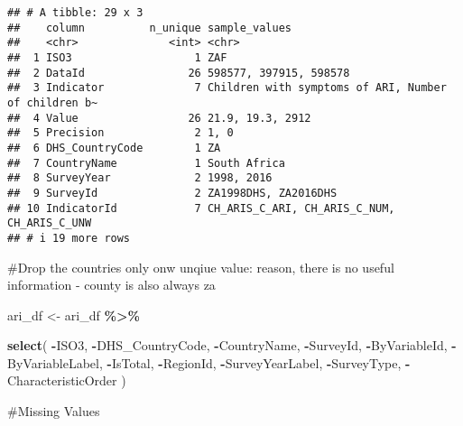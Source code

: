 \documentclass[
]{article}
\newenvironment{Shaded}{\begin{snugshade}}{\end{snugshade}}
\newcommand{\FunctionTok}[1]{\textcolor[rgb]{0.13,0.29,0.53}{\textbf{#1}}}
\newcommand{\NormalTok}[1]{#1}
\newcommand{\OtherTok}[1]{\textcolor[rgb]{0.56,0.35,0.01}{#1}}
\newcommand{\SpecialCharTok}[1]{\textcolor[rgb]{0.81,0.36,0.00}{\textbf{#1}}}
\begin{document}
\begin{verbatim}
## # A tibble: 29 x 3
##    column          n_unique sample_values                                       
##    <chr>              <int> <chr>                                               
##  1 ISO3                   1 ZAF                                                 
##  2 DataId                26 598577, 397915, 598578                              
##  3 Indicator              7 Children with symptoms of ARI, Number of children b~
##  4 Value                 26 21.9, 19.3, 2912                                    
##  5 Precision              2 1, 0                                                
##  6 DHS_CountryCode        1 ZA                                                  
##  7 CountryName            1 South Africa                                        
##  8 SurveyYear             2 1998, 2016                                          
##  9 SurveyId               2 ZA1998DHS, ZA2016DHS                                
## 10 IndicatorId            7 CH_ARIS_C_ARI, CH_ARIS_C_NUM, CH_ARIS_C_UNW         
## # i 19 more rows
\end{verbatim}

\#Drop the countries only onw unqiue value: reason, there is no useful
information - county is also always za

\begin{Shaded}
\begin{Highlighting}[]
\NormalTok{ari\_df }\OtherTok{\textless{}{-}}\NormalTok{ ari\_df }\SpecialCharTok{\%\textgreater{}\%}

 \FunctionTok{select}\NormalTok{(}
     \SpecialCharTok{{-}}\NormalTok{ISO3, }
    \SpecialCharTok{{-}}\NormalTok{DHS\_CountryCode, }
    \SpecialCharTok{{-}}\NormalTok{CountryName, }
    \SpecialCharTok{{-}}\NormalTok{SurveyId,}
    \SpecialCharTok{{-}}\NormalTok{ByVariableId, }
    \SpecialCharTok{{-}}\NormalTok{ByVariableLabel, }
    \SpecialCharTok{{-}}\NormalTok{IsTotal,}
    \SpecialCharTok{{-}}\NormalTok{RegionId, }
    \SpecialCharTok{{-}}\NormalTok{SurveyYearLabel, }
    \SpecialCharTok{{-}}\NormalTok{SurveyType,}
    \SpecialCharTok{{-}}\NormalTok{CharacteristicOrder}
\NormalTok{  )}
\end{Highlighting}
\end{Shaded}

\#Missing Values
\end{document}
